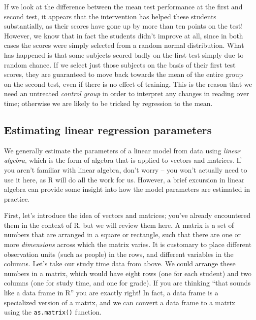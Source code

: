 \documentclass[]{book}
\newenvironment{Shaded}{\begin{snugshade}}{\end{snugshade}}
\newcommand{\KeywordTok}[1]{\textcolor[rgb]{0.13,0.29,0.53}{\textbf{#1}}}
\newcommand{\StringTok}[1]{\textcolor[rgb]{0.31,0.60,0.02}{#1}}
\newcommand{\OperatorTok}[1]{\textcolor[rgb]{0.81,0.36,0.00}{\textbf{#1}}}
\newcommand{\NormalTok}[1]{#1}
\theoremstyle{definition}
\theoremstyle{definition}
\theoremstyle{definition}
\theoremstyle{remark}
\begin{document}
If we look at the difference between the mean test performance at the
first and second test, it appears that the intervention has helped these
students substantially, as their scores have gone up by more than ten
points on the test! However, we know that in fact the students didn't
improve at all, since in both cases the scores were simply selected from
a random normal distribution. What has happened is that some subjects
scored badly on the first test simply due to random chance. If we select
just those subjects on the basis of their first test scores, they are
guaranteed to move back towards the mean of the entire group on the
second test, even if there is no effect of training. This is the reason
that we need an untreated \emph{control group} in order to interpret any
changes in reading over time; otherwise we are likely to be tricked by
regression to the mean.

\subsection{Estimating linear regression
parameters}\label{estimating-linear-regression-parameters}

We generally estimate the parameters of a linear model from data using
\emph{linear algebra}, which is the form of algebra that is applied to
vectors and matrices. If you aren't familiar with linear algebra, don't
worry -- you won't actually need to use it here, as R will do all the
work for us. However, a brief excursion in linear algebra can provide
some insight into how the model parameters are estimated in practice.

First, let's introduce the idea of vectors and matrices; you've already
encountered them in the context of R, but we will review them here. A
matrix is a set of numbers that are arranged in a square or rectangle,
such that there are one or more \emph{dimensions} across which the
matrix varies. It is customary to place different observation units
(such as people) in the rows, and different variables in the columns.
Let's take our study time data from above. We could arrange these
numbers in a matrix, which would have eight rows (one for each student)
and two columns (one for study time, and one for grade). If you are
thinking ``that sounds like a data frame in R'' you are exactly right!
In fact, a data frame is a specialized version of a matrix, and we can
convert a data frame to a matrix using the \texttt{as.matrix()}
function.

\begin{Shaded}
\end{Shaded}
\end{document}
